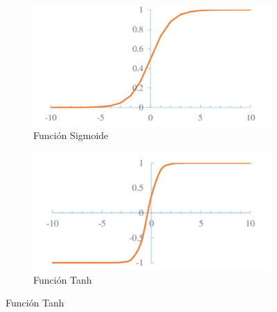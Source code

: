 \begin{figure}
        \centering
        \begin{subfigure}[h]{0.45\textwidth} 
            \includegraphics[width=\textwidth]{imagenes/Cap4/sigmoid}
            \caption{Funci\'{o}n Sigmoide}
            \label{fig:sigmoid}
        \end{subfigure}       
        \begin{subfigure}[h]{0.45\textwidth} 
            \includegraphics[width=\textwidth]{imagenes/Cap4/tanh}
            \caption{Funci\'{o}n Tanh}
            \label{fig:tanh}
        \end{subfigure}
        

\end{figure}

